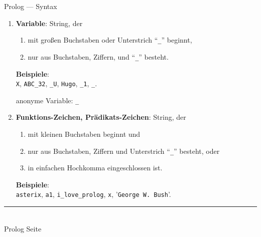 \documentclass{slides}
\newcommand{\myrule}{\rule{20cm}{1mm}\\ }
\newcounter{mypage}
\begin{document}
\begin{slide}{}
\normalsize
\begin{center}
Prolog --- Syntax
\end{center}
\vspace{0.5cm}

\footnotesize
\begin{enumerate}
\item \textbf{Variable}: String, der 
      \begin{enumerate}
      \item mit großen Buchstaben oder Unterstrich ``\texttt{\_}'' beginnt,
      \item nur aus Buchstaben, Ziffern, und ``\texttt{\_}'' besteht.
      \end{enumerate}
      \textbf{Beispiele}: 
      \\[0.3cm]
      \hspace*{1.3cm} \texttt{X}, \texttt{ABC\_32}, \texttt{\_U}, \texttt{Hugo},
      \texttt{\_1}, \texttt{\_}.
      
      anonyme Variable: \texttt{\_}
\item \textbf{Funktions-Zeichen, Prädikats-Zeichen}: String, der
      \begin{enumerate}
      \item mit kleinen Buchstaben beginnt und 
      \item nur aus Buchstaben, Ziffern und Unterstrich ``\texttt{\_}'' besteht, oder
      \item in einfachen Hochkomma eingeschlossen ist.
      \end{enumerate}
      \textbf{Beispiele}:
      \\[0.3cm]
      \hspace*{1.3cm}      
      \texttt{asterix}, \texttt{a1}, \texttt{i\_love\_prolog}, \texttt{x}, '\texttt{George W. Bush}'.
\end{enumerate}


\vspace*{\fill}
\tiny \addtocounter{mypage}{1}
\myrule
Prolog  \hspace*{\fill} Seite 
\end{slide}
\end{document}
